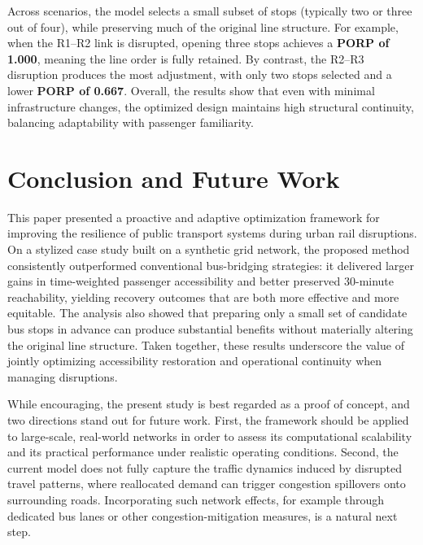 \documentclass[3p,times,procedia]{elsarticle}
\begin{document}
Across scenarios, the model selects a small subset of stops (typically two or three out of four), while preserving much of the original line structure. For example, when the R1--R2 link is disrupted, opening three stops achieves a \textbf{PORP of 1.000}, meaning the line order is fully retained. By contrast, the R2--R3 disruption produces the most adjustment, with only two stops selected and a lower \textbf{PORP of 0.667}. Overall, the results show that even with minimal infrastructure changes, the optimized design maintains high structural continuity, balancing adaptability with passenger familiarity.


\section{Conclusion and Future Work}
This paper presented a proactive and adaptive optimization framework for improving the resilience of public transport systems during urban rail disruptions. On a stylized case study built on a synthetic grid network, the proposed method consistently outperformed conventional bus-bridging strategies: it delivered larger gains in time-weighted passenger accessibility and better preserved 30-minute reachability, yielding recovery outcomes that are both more effective and more equitable. The analysis also showed that preparing only a small set of candidate bus stops in advance can produce substantial benefits without materially altering the original line structure. Taken together, these results underscore the value of jointly optimizing accessibility restoration and operational continuity when managing disruptions.

While encouraging, the present study is best regarded as a proof of concept, and two directions stand out for future work. First, the framework should be applied to large-scale, real-world networks in order to assess its computational scalability and its practical performance under realistic operating conditions. Second, the current model does not fully capture the traffic dynamics induced by disrupted travel patterns, where reallocated demand can trigger congestion spillovers onto surrounding roads. Incorporating such network effects, for example through dedicated bus lanes or other congestion-mitigation measures, is a natural next step.
\end{document}
